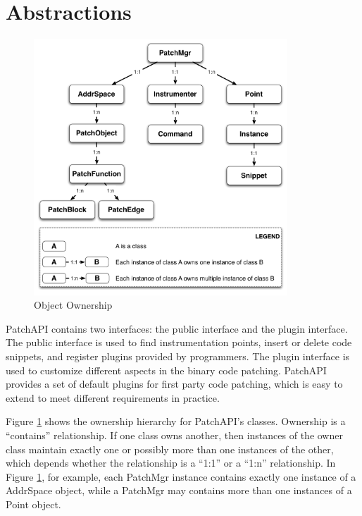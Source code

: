 \section{Abstractions}
\label{sec-abs}

\begin{figure}[ht!]
\centerline{\includegraphics[width=0.85\textwidth]{./figure/abstraction/img.pdf}}
\caption{\label{fig:abs}Object Ownership}
\end{figure}


PatchAPI contains two interfaces: the public interface and the plugin interface.
The public interface is used to find instrumentation points, insert or delete
code snippets, and register plugins provided by programmers. The plugin
interface is used to customize different aspects in the binary code patching.
PatchAPI provides a set of default plugins for first party code patching, which
is easy to extend to meet different requirements in practice.

Figure \ref{fig:abs} shows the ownership hierarchy for PatchAPI's classes.
Ownership is a ``contains'' relationship. If one class owns another, then
instances of the owner class maintain exactly one or possibly more than one
instances of the other, which depends whether the relationship is a ``1:1'' or a
``1:n'' relationship. In Figure \ref{fig:abs}, for example, each PatchMgr instance
contains exactly one instance of a AddrSpace object, while a PatchMgr may
contains more than one instances of a Point object.

